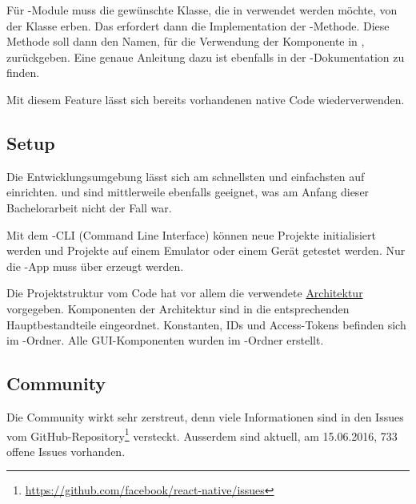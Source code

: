 Für -Module muss die gewünschte Klasse, die in  verwendet werden möchte, von der Klasse  erben. 
Das erfordert dann die Implementation der -Methode. 
Diese Methode soll dann den Namen, für die Verwendung der Komponente in , zurückgeben. 
Eine genaue Anleitung dazu ist ebenfalls in der -Dokumentation zu finden.\cite{react-native-module-android}

Mit diesem Feature lässt sich bereits vorhandenen native Code wiederverwenden. 


\subsection{Setup}
Die Entwicklungsumgebung lässt sich am schnellsten und einfachsten auf  einrichten. 
 und  sind mittlerweile ebenfalls geeignet, was am Anfang dieser Bachelorarbeit nicht der Fall war. 

Mit dem -CLI (Command Line Interface) können neue Projekte initialisiert werden und Projekte auf einem Emulator oder einem Gerät getestet werden. 
Nur die -App muss über  erzeugt werden. 

Die Projektstruktur vom  Code hat vor allem die verwendete \hyperref[pd-architektur]{Architektur} vorgegeben. 
Komponenten der Architektur sind in die entsprechenden Hauptbestandteile eingeordnet. 
Konstanten, IDs und Access-Tokens befinden sich im -Ordner. 
Alle \gls{GUI}-Komponenten wurden im -Ordner erstellt. 


\subsection{Community}
Die Community wirkt sehr zerstreut, denn viele Informationen sind in den Issues vom  GitHub-Repository\footnote{\url{https://github.com/facebook/react-native/issues}} versteckt.
Ausserdem sind aktuell, am 15.06.2016, 733 offene Issues vorhanden.

